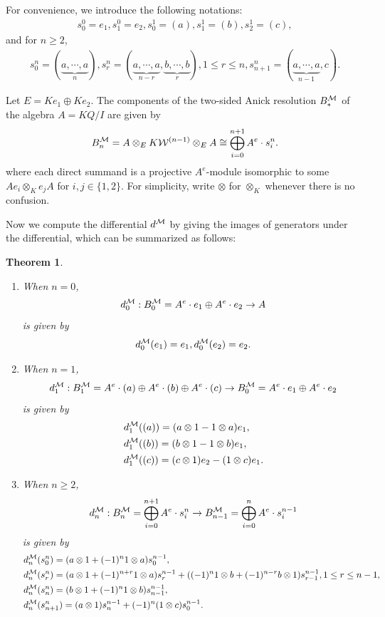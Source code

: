 \documentclass[10pt, reqno]{amsart}
\newtheorem{theorem}{Theorem}[section]
\theoremstyle{definition}
\theoremstyle{remark}
\numberwithin{equation}{section}
\begin{document}
For convenience, we introduce the following notations:
\[\begin{gathered}
    s_0^0 = e_1, s_1^0 =e_2, 
    s_0^1= (a), s_1^1= (b), s_2^1 = (c),\end{gathered}\]
    and for $n\ge 2$, 
   \[\begin{gathered}s_0^n=(\underbrace{a, \cdots,a}_{n}), s_r^n=(\underbrace{a, \cdots,a}_{n-r}, \underbrace{b, \cdots, b}_{r}), 1 \le r \le n, s_{n+1}^n= (\underbrace{a, \cdots,a}_{n-1}, c).\end{gathered}\]
   
Let \(E=Ke_1\oplus Ke_2 \). The components of the two-sided Anick resolution \(B_*^{\mathcal{M}}\) of the algebra \(A=KQ/I\) are given by
\[B_n^{\mathcal{M}}  = A \otimes_E K\mathcal{W}^{(n-1)} \otimes_E A \cong \bigoplus_{i=0}^{n+1} A^e \cdot s_i^n.\] 
where each direct summand is a projective \(A^e\)-module   isomorphic to  some \(Ae_i \otimes_K e_jA\) for   \(i,j\in \{1,2\}\). 
For simplicity, write \(\otimes\) for \(\otimes_K\) whenever there is no confusion. 

Now we compute the differential \(d^{\mathcal{M}}\) by giving the images of generators under the differential, which can be summarized  as follows:
\begin{theorem}
\begin{enumerate}
    \item When \(n=0\), $$d_0^{\mathcal{M}}: B_0^{\mathcal{M}}=A^e \cdot e_1\oplus A^e \cdot e_2\to A$$
is given by $$d_0^{\mathcal{M}}(e_1) = e_1, d_0^{\mathcal{M}}(e_2) = e_2.$$
  \item When \(n=1\),  $$d_1^{\mathcal{M}}: B_1^{\mathcal{M}}=A^e \cdot (a)\oplus A^e \cdot (b)\oplus A^e \cdot (c)\to B_0^{\mathcal{M}}=A^e \cdot e_1\oplus A^e \cdot e_2$$
is given by  \[ \begin{aligned}
    &d_1^{\mathcal{M}}((a))= (a \otimes 1- 1\otimes a)  e_1, \\
    &d_1^{\mathcal{M}}((b))= (b \otimes 1- 1\otimes b) e_1, \\
    &d_1^{\mathcal{M}}((c))= (c \otimes 1)  e_2 - (1\otimes c)  e_1.
\end{aligned}
\]
 
\item When \(n\ge 2\), $$d_n^{\mathcal{M}}: B_n^{\mathcal{M}}  = \bigoplus_{i=0}^{n+1} A^e \cdot s_i^n \to  B_{n-1}^{\mathcal{M}}  = \bigoplus_{i=0}^{n} A^e \cdot s_i^{n-1} $$ is given by 
  \[\begin{aligned}
    &d_n^{\mathcal{M}}(s_0^n)= (a \otimes 1 + (-1)^n1\otimes a)  s_0^{n-1}, \\
    &d_n^{\mathcal{M}}(s_r^n)= (a \otimes 1 + (-1)^{n+r}1\otimes a) s_r^{n-1}+((-1)^n 1\otimes b+(-1)^{n-r}b \otimes 1)s_{r-1}^{n-1}, 1\le r \le n-1, \\
   &d_n^{\mathcal{M}}(s_n^n)= (b \otimes 1+ (-1)^n 1\otimes b) s_{n-1}^{n-1}, \\
   &d_n^{\mathcal{M}}(s_{n+1}^n)= (a \otimes 1) s_n^{n-1} + (-1)^n (1\otimes c)  s_0^{n-1}.
\end{aligned}\]
\end{enumerate}
\end{theorem}
\end{document}

